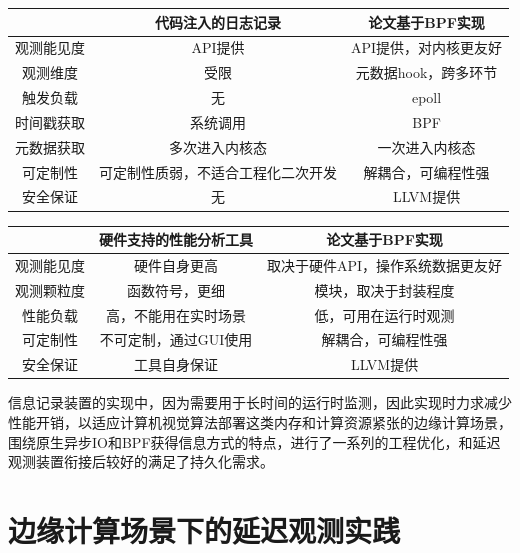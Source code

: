 \documentclass[master]{shtthesis}
\begin{document}
\begin{table}[htbp]
	\centering
	\label{对比代码注入日志方式}
	\begin{tabular}{ccc}
	\toprule
	   & 代码注入的日志记录 & 论文基于BPF实现 \\
	\midrule
	观测能见度 & API提供 & API提供，对内核更友好\\
	观测维度   & 受限  & 元数据hook，跨多环节  \\ 
	触发负载 & 无 & epoll \\
	时间戳获取 & 系统调用 & BPF \\
	元数据获取 & 多次进入内核态 & 一次进入内核态 \\
	可定制性 & 可定制性质弱，不适合工程化二次开发 & 解耦合，可编程性强\\
	安全保证 & 无 & LLVM提供 \\
	\bottomrule
	\end{tabular}
\end{table}

\begin{table}[htbp]
	\centering
	\label{对比硬件支持的性能分析工具}
	\begin{tabular}{ccc}
		\toprule
		& 硬件支持的性能分析工具 & 论文基于BPF实现 \\
		\midrule
		观测能见度 & 硬件自身更高 & 取决于硬件API，操作系统数据更友好\\
		观测颗粒度   & 函数符号，更细  & 模块，取决于封装程度  \\ 
		性能负载 & 高，不能用在实时场景 & 低，可用在运行时观测 \\
		可定制性 & 不可定制，通过GUI使用 & 解耦合，可编程性强\\
		安全保证 & 工具自身保证 & LLVM提供 \\
		\bottomrule
	\end{tabular}
\end{table}

信息记录装置的实现中，因为需要用于长时间的运行时监测，因此实现时力求减少性能开销，以适应计算机视觉算法部署这类内存和计算资源紧张的边缘计算场景，围绕原生异步IO和BPF获得信息方式的特点，进行了一系列的工程优化，和延迟观测装置衔接后较好的满足了持久化需求。

\chapter{边缘计算场景下的延迟观测实践}
\end{document}
